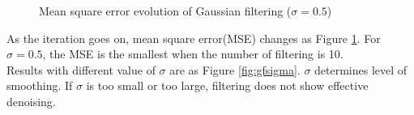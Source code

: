 \documentclass[paper=a4, fontsize=11pt]{scrartcl} %
\numberwithin{equation}{section} %
\numberwithin{figure}{section} %
\numberwithin{table}{section} %
\begin{document}
\begin{figure}[H]
	\centering
	\noindent{}
\caption{Mean square error evolution of Gaussian filtering ($\sigma = 0.5$) \label{fig:gfmse}}
\end{figure}

As the iteration goes on, mean square error(MSE) changes as Figure \ref{fig:gfmse}. For $\sigma = 0.5$, the MSE is the smallest when the number of filtering is 10. \\ 

Results with different value of $\sigma$ are as Figure \ref{fig:gfsigma}. $\sigma$ determines level of smoothing. If $\sigma$ is too small or too large, filtering does not show effective denoising.
\end{document}
